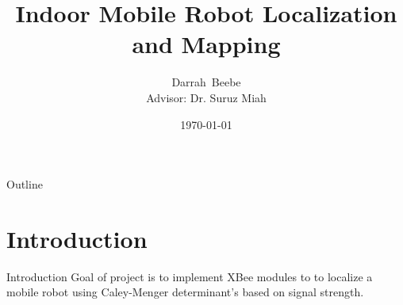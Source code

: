 \documentclass{beamer}
\title[Localization and Mapping]{Indoor Mobile Robot Localization and Mapping}
\author[D.~Beebe]{Darrah~Beebe\\
Advisor: Dr. Suruz Miah}
\institute[Bradley University] %
{
  Department of Electrical and Computer Engineering\\
  Bradley University\\
  1501 W. Bradley Avenue\\
  Peoria, IL, 61625, USA
}
\date[\today]{\today}
\begin{document}
\begin{frame}
  \titlepage
\end{frame}

\begin{frame}{Outline}
  \tableofcontents
\end{frame}

\section{Introduction}

\begin{frame}{Introduction}{}
  Goal of project is to implement XBee modules to to localize a mobile robot using Caley-Menger determinant's based on signal strength.
\end{frame}




  



  


\end{document}

